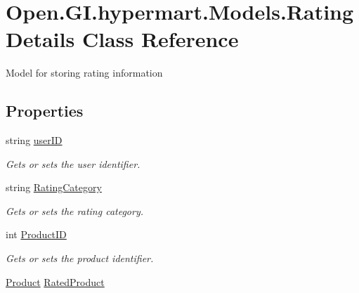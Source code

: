 \hypertarget{class_open_1_1_g_i_1_1hypermart_1_1_models_1_1_rating_details}{}\section{Open.\+G\+I.\+hypermart.\+Models.\+Rating\+Details Class Reference}
\label{class_open_1_1_g_i_1_1hypermart_1_1_models_1_1_rating_details}


Model for storing rating information  


\subsection*{Properties}
\begin{DoxyCompactItemize}
\item 
string \hyperlink{class_open_1_1_g_i_1_1hypermart_1_1_models_1_1_rating_details_aafdd0169f033f4d9f2ccc055f938c524}{user\+ID}
\begin{DoxyCompactList}\small\item\em Gets or sets the user identifier. \end{DoxyCompactList}\item 
string \hyperlink{class_open_1_1_g_i_1_1hypermart_1_1_models_1_1_rating_details_a3c293c7912e7c60b75128586706db64a}{Rating\+Category}
\begin{DoxyCompactList}\small\item\em Gets or sets the rating category. \end{DoxyCompactList}\item 
int \hyperlink{class_open_1_1_g_i_1_1hypermart_1_1_models_1_1_rating_details_a52049471fb02928fdd8f3b3d9c127a43}{Product\+ID}
\begin{DoxyCompactList}\small\item\em Gets or sets the product identifier. \end{DoxyCompactList}\item 
\hyperlink{class_open_1_1_g_i_1_1hypermart_1_1_models_1_1_product}{Product} \hyperlink{class_open_1_1_g_i_1_1hypermart_1_1_models_1_1_rating_details_a56011ceff140008b151d983b78371002}{Rated\+Product}

\end{DoxyCompactItemize}

